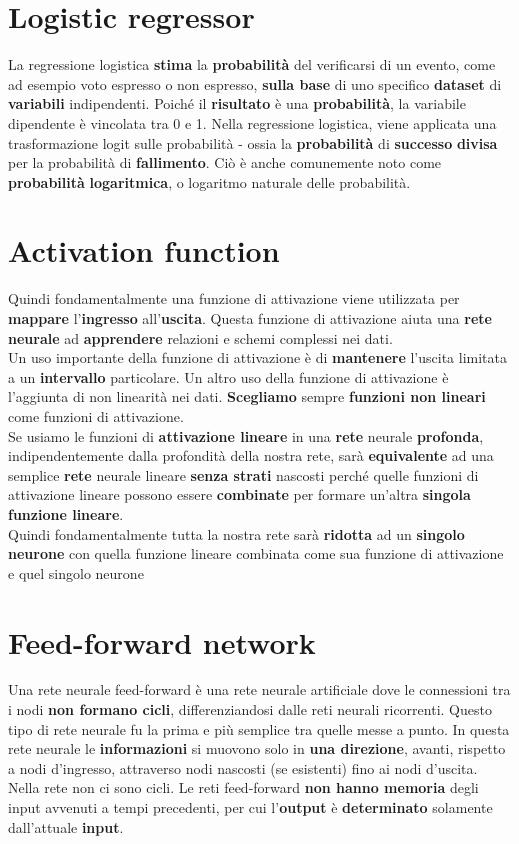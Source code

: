 \documentclass{article}
\begin{document}
\section{Logistic regressor}
La regressione logistica \textbf{stima} la \textbf{probabilità} del verificarsi di un evento, come ad esempio voto espresso o non espresso, \textbf{sulla base} di uno specifico \textbf{dataset} di \textbf{variabili} indipendenti. Poiché il \textbf{risultato} è una \textbf{probabilità}, la variabile dipendente è vincolata tra 0 e 1. Nella regressione logistica, viene applicata una trasformazione logit sulle probabilità - ossia la \textbf{probabilità} di \textbf{successo} \textbf{divisa} per la probabilità di \textbf{fallimento}. Ciò è anche comunemente noto come \textbf{probabilità} \textbf{logaritmica}, o logaritmo naturale delle probabilità.

\section{Activation function}
Quindi fondamentalmente una funzione di attivazione viene utilizzata per \textbf{mappare} l’\textbf{ingresso} all’\textbf{uscita}. Questa funzione di attivazione aiuta una \textbf{rete} \textbf{neurale} ad \textbf{apprendere} relazioni e schemi complessi nei dati.\\
Un uso importante della funzione di attivazione è di \textbf{mantenere} l’uscita limitata a un \textbf{intervallo} particolare. Un altro uso della funzione di attivazione è l’aggiunta di non linearità nei dati. \textbf{Scegliamo} sempre \textbf{funzioni non lineari} come funzioni di attivazione.\\
Se usiamo le funzioni di \textbf{attivazione lineare} in una \textbf{rete} neurale \textbf{profonda}, indipendentemente dalla profondità della nostra rete, sarà \textbf{equivalente} ad una semplice \textbf{rete} neurale lineare \textbf{senza strati} nascosti perché quelle funzioni di attivazione lineare possono essere \textbf{combinate} per formare un’altra \textbf{singola funzione lineare}.  \\

Quindi fondamentalmente tutta la nostra rete sarà \textbf{ridotta} ad un \textbf{singolo neurone} con quella funzione lineare combinata come sua funzione di attivazione e quel singolo neurone

\section{Feed-forward
network}
Una rete neurale feed-forward  è una rete neurale artificiale dove le connessioni tra i nodi \textbf{non formano cicli}, differenziandosi dalle reti neurali ricorrenti. Questo tipo di rete neurale fu la prima e più semplice tra quelle messe a punto. In questa rete neurale le \textbf{informazioni} si muovono solo in \textbf{una direzione}, avanti, rispetto a nodi d'ingresso, attraverso nodi nascosti (se esistenti) fino ai nodi d'uscita. Nella rete non ci sono cicli. Le reti feed-forward \textbf{non hanno memoria }degli input avvenuti a tempi precedenti, per cui l'\textbf{output} è \textbf{determinato} solamente dall'attuale \textbf{input}.
\end{document}
